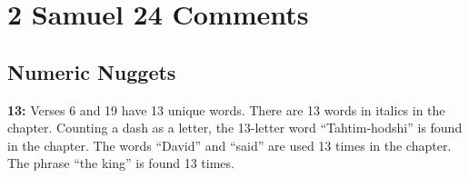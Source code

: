 \section{2 Samuel 24 Comments}

\subsection{Numeric Nuggets}
\textbf{13:} Verses 6 and 19 have 13 unique words. There are 13 words in italics in the chapter. Counting a dash as a letter, the 13-letter word ``Tahtim-hodshi'' is found in the chapter. The words ``David'' and ``said'' are used 13 times in the chapter. The phrase ``the king'' is found 13 times.